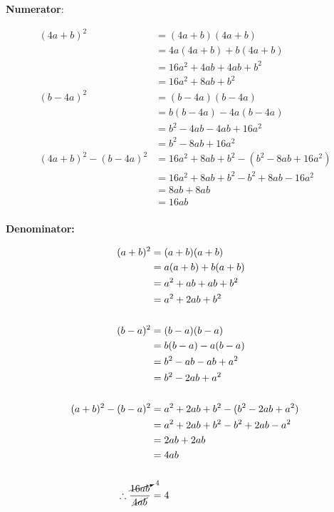 \documentclass[
  a4paperpaper,
]{scrbook}
\begin{document}
\begin{tcolorbox}[enhanced jigsaw, left=2mm, colframe=quarto-callout-caution-color-frame, toptitle=1mm, opacitybacktitle=0.6, rightrule=.15mm, colbacktitle=quarto-callout-caution-color!10!white, colback=white, arc=.35mm, breakable, leftrule=.75mm, bottomtitle=1mm, bottomrule=.15mm, title=\textcolor{quarto-callout-caution-color}{\faFire}\hspace{0.5em}{Solution}, titlerule=0mm, coltitle=black, toprule=.15mm, opacityback=0]

\textbf{Numerator}:

\begin{equation}
\begin{split}
(4a + b)^2 & = (4a + b)(4a + b) \\ 
& = 4a(4a + b) + b(4a + b) \\ 
& = 16a^2 + 4ab + 4ab + b^2 \\ 
& = 16a^2 + 8ab + b^2 \\ 
(b - 4a)^2 & = (b - 4a)(b - 4a) \\ 
& = b(b - 4a) - 4a(b - 4a) \\ 
& = b^2 - 4ab - 4ab + 16a^2 \\ 
& = b^2 - 8ab + 16a^2 \\ 
(4a + b)^2 - (b - 4a)^2 & = 16a^2 + 8ab + b^2 - (b^2 - 8ab + 16a^2) \\ 
& = 16a^2 + 8ab + b^2 - b^2 + 8ab - 16a^2 \\ 
& = 8ab + 8ab \\ 
& = 16ab \\ 
\end{split}
\end{equation}

\textbf{Denominator:}

\begin{equation}
\begin{split}
(a + b)^2 & = (a + b)(a + b) \\ 
& = a(a + b) + b(a + b) \\ 
& = a^2 + ab + ab + b^2 \\ 
& = a^2 + 2ab + b^2 \\ 
\\
(b - a)^2 & = (b - a)(b - a) \\ 
& = b(b - a) - a(b - a) \\ 
& = b^2 - ab - ab + a^2 \\ 
& = b^2 - 2ab + a^2 \\ 
\\
(a + b)^2 - (b - a)^2 & = a^2 + 2ab + b^2 - (b^2 - 2ab + a^2) \\ 
& = a^2 + 2ab + b^2 - b^2 + 2ab - a^2 \\ 
& = 2ab + 2ab \\ 
& = 4ab \\ 
\\
\therefore \frac{\cancelto{4}{16ab}}{\cancel{4ab}} & = 4 \\ 
\end{split}
\end{equation}

\end{tcolorbox}
\end{document}
